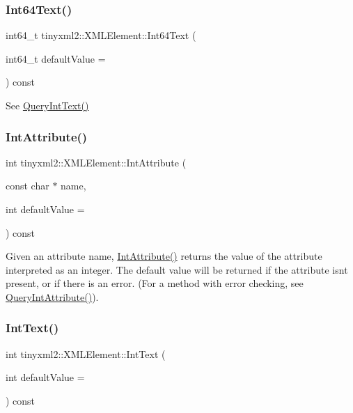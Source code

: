\subsubsection{\texorpdfstring{Int64\+Text()}{Int64Text()}}
{\footnotesize\ttfamily int64\+\_\+t tinyxml2\+::\+X\+M\+L\+Element\+::\+Int64\+Text (\begin{DoxyParamCaption}\item[{int64\+\_\+t}]{default\+Value = {} }\end{DoxyParamCaption}) const}



See \hyperlink{classtinyxml2_1_1_x_m_l_element_a926357996bef633cb736e1a558419632}{Query\+Int\+Text()} 

\mbox{\label{classtinyxml2_1_1_x_m_l_element_a95a89b13bb14a2d4655e2b5b406c00d4}} 
\subsubsection{\texorpdfstring{Int\+Attribute()}{IntAttribute()}}
{\footnotesize\ttfamily int tinyxml2\+::\+X\+M\+L\+Element\+::\+Int\+Attribute (\begin{DoxyParamCaption}\item[{const char $\ast$}]{name,  }\item[{int}]{default\+Value = {} }\end{DoxyParamCaption}) const}

Given an attribute name, \hyperlink{classtinyxml2_1_1_x_m_l_element_a95a89b13bb14a2d4655e2b5b406c00d4}{Int\+Attribute()} returns the value of the attribute interpreted as an integer. The default value will be returned if the attribute isn\textquotesingle{}t present, or if there is an error. (For a method with error checking, see \hyperlink{classtinyxml2_1_1_x_m_l_element_a8a78bc1187c1c45ad89f2690eab567b1}{Query\+Int\+Attribute()}). \mbox{\label{classtinyxml2_1_1_x_m_l_element_a37b0636adebb8a1a1bc965f60824cb3e}} 
\subsubsection{\texorpdfstring{Int\+Text()}{IntText()}}
{\footnotesize\ttfamily int tinyxml2\+::\+X\+M\+L\+Element\+::\+Int\+Text (\begin{DoxyParamCaption}\item[{int}]{default\+Value = {} }\end{DoxyParamCaption}) const}

